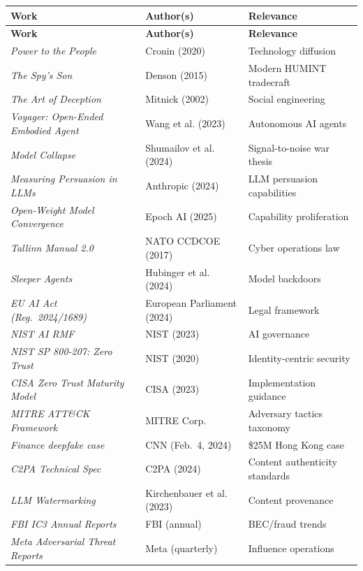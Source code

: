 \documentclass[11pt,letterpaper]{article}
\newcommand{\etraneed}[1]{\par\ifdim\pagegoal<\maxdimen\ifdim\pagetotal<\pagegoal\ifdim\dimexpr\pagegoal-\pagetotal\relax<\dimexpr#1\relax\newpage\fi\fi\fi}
\begin{document}
\etraneed{6\baselineskip}
{\small
\begin{longtable}{L{6.4cm}L{4.4cm}L{5.2cm}}
\toprule
\textbf{Work} & \textbf{Author(s)} & \textbf{Relevance} \\
\midrule
\endfirsthead
\toprule
\textbf{Work} & \textbf{Author(s)} & \textbf{Relevance} \\
\midrule
\endhead
\textit{Power to the People} & Cronin (2020) & Technology diffusion \\*
\textit{The Spy's Son} & Denson (2015) & Modern HUMINT tradecraft \\
\textit{The Art of Deception} & Mitnick (2002) & Social engineering \\
\textit{Voyager: Open-Ended Embodied Agent} & Wang et al. (2023) & Autonomous AI agents \\
\textit{Model Collapse} & Shumailov et al. (2024) & Signal-to-noise war thesis \\
\textit{Measuring Persuasion in LLMs} & Anthropic (2024) & LLM persuasion capabilities \\
\textit{Open-Weight Model Convergence} & Epoch AI (2025) & Capability proliferation \\
\textit{Tallinn Manual 2.0} & NATO CCDCOE (2017) & Cyber operations law \\
\textit{Sleeper Agents} & Hubinger et al. (2024) & Model backdoors \\
\textit{EU AI Act (Reg.\ 2024/1689)} & European Parliament (2024) & Legal framework \\
\textit{NIST AI RMF} & NIST (2023) & AI governance \\
\textit{NIST SP 800-207: Zero Trust} & NIST (2020) & Identity-centric security \\
\textit{CISA Zero Trust Maturity Model} & CISA (2023) & Implementation guidance \\
\textit{MITRE ATT\&CK Framework} & MITRE Corp. & Adversary tactics taxonomy \\
\textit{Finance deepfake case} & CNN (Feb.\ 4, 2024) & \$25M Hong Kong case \\
\textit{C2PA Technical Spec} & C2PA (2024) & Content authenticity standards \\
\textit{LLM Watermarking} & Kirchenbauer et al. (2023) & Content provenance \\
\textit{FBI IC3 Annual Reports} & FBI (annual) & BEC/fraud trends \\
\textit{Meta Adversarial Threat Reports} & Meta (quarterly) & Influence operations \\

\end{longtable}}
\end{document}
